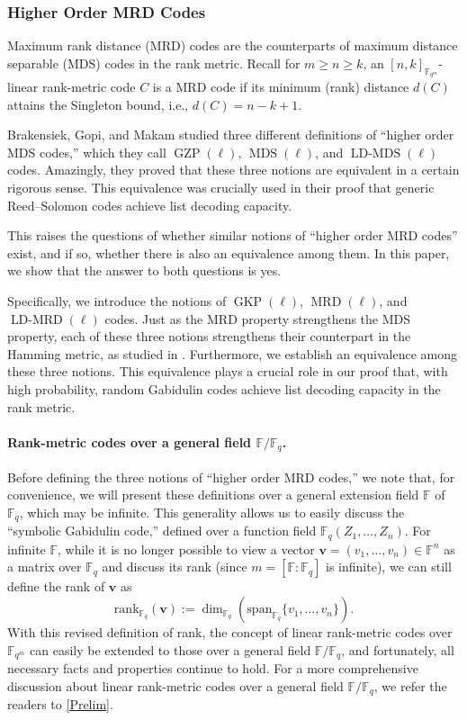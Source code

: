 \documentclass[11pt]{article}
\theoremstyle{plain}
\theoremstyle{definition}
\theoremstyle{remark}
\newcommand{\F}{\mathbb{F}}
\newcommand{\spa}{\mathrm{span}}
\newcommand{\bv}{\bm{v}}
\newcommand{\rank}{\mathrm{rank}}
\begin{document}
\subsubsection{Higher Order MRD Codes} 

Maximum rank distance (MRD) codes are the counterparts of maximum distance separable (MDS) codes in the rank metric.
Recall for $m\geq n\geq k$, an $[n,k]_{\F_{q^m}}$-linear rank-metric code $C$ is a MRD code if its minimum (rank) distance $d(C)$ attains the Singleton bound, i.e., $d(C)=n-k+1$.

Brakensiek, Gopi, and Makam \cite{brakensiek2023generic} studied three different definitions of ``higher order MDS codes,'' which they call $\operatorname{GZP}(\ell)$, $\operatorname{MDS}(\ell)$, and $\operatorname{LD-MDS}(\ell)$ codes. Amazingly, they proved that these three notions are equivalent in a certain rigorous sense.
This equivalence was crucially used in their proof that generic Reed--Solomon codes achieve list decoding capacity.

This raises the questions of whether similar notions of ``higher order MRD codes'' exist, and if so, whether there is also an equivalence among them. In this paper, we show that the answer to both questions is yes.

Specifically, we introduce the notions of $\operatorname{GKP}(\ell)$, $\operatorname{MRD}(\ell)$, and $\operatorname{LD-MRD}(\ell)$ codes.
Just as the MRD property strengthens the MDS property, each of these three notions strengthens their counterpart in the Hamming metric, as studied in \cite{brakensiek2023generic}. Furthermore, we establish an equivalence among these three notions. This equivalence plays a crucial role in our proof that, with high probability, random Gabidulin codes achieve list decoding capacity in the rank metric.

\paragraph{Rank-metric codes over a general field $\F/\F_q$.}
Before defining the three notions of ``higher order MRD codes,'' we note that, for convenience, we will present these definitions over a general extension field $\F$ of $\F_q$, which may be infinite. 
This generality allows us to easily discuss the ``symbolic Gabidulin code,'' defined over a function field $\F_q(Z_1,\dots,Z_n)$.
For infinite $\F$, while it is no longer possible to view a vector $\bv=(v_1,\dots,v_n)\in \F^n$ as a matrix over $\F_q$ and discuss its rank (since $m=[\F:\F_q]$ is infinite), we can still define the rank of $\bv$ as
\begin{equation}\label{eq:rank}
\rank_{\F_q}(\bv):=\dim_{\F_q}(\spa_{\F_q}\{v_1,\ldots,v_n\}).
\end{equation}
With this revised definition of rank, the concept of linear rank-metric codes over $\F_{q^m}$ can easily be extended to those over a general field $\F/\F_q$, and fortunately, all necessary facts and properties continue to hold. For a more comprehensive discussion about linear rank-metric codes over a general field $\F/\F_q$, we refer the readers to \cref{Prelim}.
\end{document}
